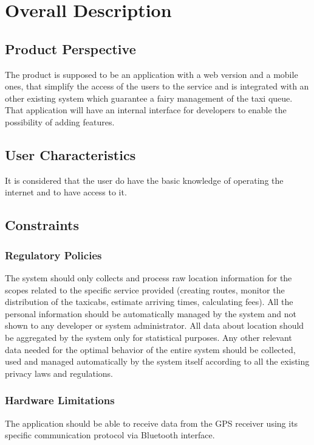 \chapter{Overall Description} \label{chap2}

\section{Product Perspective}
The product is supposed to be an application with a web version and a mobile ones, that simplify the access of the users to the service and is integrated with an other existing system which guarantee a fairy management of the taxi queue. That application will have an internal interface for developers to enable the possibility of adding features.

\section{User Characteristics}
It is considered that the user do have the basic knowledge of operating the internet and to have access to it.

\section{Constraints}
\subsection{Regulatory Policies}
The system should only collects and process raw location information for the scopes related to the specific service provided (creating routes, monitor the distribution of the taxicabs, estimate arriving times, calculating fees). All the personal information should be automatically managed by the system and not shown to any developer or system administrator. All data about location should be aggregated by the system only for statistical purposes. 
Any other relevant data needed for the optimal behavior of the entire system should be collected, used and managed automatically by the system itself according to all the existing privacy laws and regulations.  

\subsection{Hardware Limitations}
The application should be able to receive data from the GPS receiver using its specific communication protocol via Bluetooth interface. 

